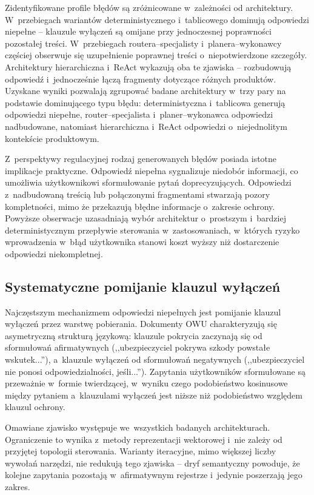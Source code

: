 Zidentyfikowane profile błędów są zróżnicowane w~zależności od architektury.
W~przebiegach wariantów deterministycznego i~tablicowego dominują odpowiedzi
niepełne -- klauzule wyłączeń są omijane przy jednoczesnej poprawności
pozostałej treści. W~przebiegach routera--specjalisty i~planera--wykonawcy
częściej obserwuje się uzupełnienie poprawnej treści o~niepotwierdzone
szczegóły. Architektury hierarchiczna i~ReAct wykazują oba te zjawiska --
rozbudowują odpowiedź i~jednocześnie łączą fragmenty dotyczące różnych
produktów. Uzyskane wyniki pozwalają zgrupować badane architektury w~trzy pary
na podstawie dominującego typu błędu: deterministyczna i~tablicowa generują
odpowiedzi niepełne, router--specjalista i~planer--wykonawca odpowiedzi
nadbudowane, natomiast hierarchiczna i~ReAct odpowiedzi o~niejednolitym
kontekście produktowym.

Z~perspektywy regulacyjnej rodzaj generowanych błędów posiada istotne
implikacje praktyczne. Odpowiedź niepełna sygnalizuje niedobór informacji, co
umożliwia użytkownikowi sformułowanie pytań doprecyzujących. Odpowiedzi
z~nadbudowaną treścią lub połączonymi fragmentami stwarzają pozory
kompletności, mimo że przekazują błędne informacje o~zakresie ochrony. Powyższe
obserwacje uzasadniają wybór architektur o~prostszym i~bardziej
deterministycznym przepływie sterowania w~zastosowaniach, w~których ryzyko
wprowadzenia w~błąd użytkownika stanowi koszt wyższy niż dostarczenie
odpowiedzi niekompletnej.

\subsection{Systematyczne pomijanie klauzul wyłączeń}\label{subsec:systematyczne-pomijanie-klauzul-wylaczen}

Najczęstszym mechanizmem odpowiedzi niepełnych jest pomijanie klauzul wyłączeń
przez warstwę pobierania. Dokumenty OWU charakteryzują się asymetryczną
strukturą językową: klauzule pokrycia zaczynają się od sformułowań
afirmatywnych (,,ubezpieczyciel pokrywa szkody powstałe wskutek...''),
a~klauzule wyłączeń od sformułowań negatywnych (,,ubezpieczyciel nie ponosi
odpowiedzialności, jeśli...''). Zapytania użytkowników sformułowane są
przeważnie w~formie twierdzącej, w~wyniku czego podobieństwo kosinusowe między
pytaniem a~klauzulami wyłączeń jest niższe niż podobieństwo względem klauzul
ochrony.

Omawiane zjawisko występuje we~wszystkich badanych architekturach. Ograniczenie
to wynika z~metody reprezentacji wektorowej i~nie zależy od przyjętej topologii
sterowania. Warianty iteracyjne, mimo większej liczby wywołań narzędzi, nie
redukują tego zjawiska -- dryf semantyczny powoduje, że kolejne zapytania
pozostają w~afirmatywnym rejestrze i~jedynie poszerzają jego zakres.

